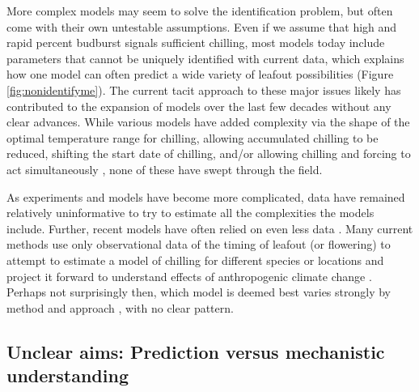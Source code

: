 \documentclass[11pt]{article}
\begin{document}
More complex models may seem to solve the identification problem, but often come with their own untestable assumptions. Even if we assume that high and rapid percent budburst signals sufficient chilling, most models today include parameters that cannot be uniquely identified with current data, which explains how one model can often predict a wide variety of leafout possibilities (Figure \ref{fig:nonidentifyme}). The current tacit approach to these major issues likely has contributed to the expansion of models over the last few decades without any clear advances. While various models have added complexity via the shape of the optimal temperature range for chilling, allowing accumulated chilling to be reduced, shifting the start date of chilling, and/or allowing chilling and forcing to act simultaneously \citep{hanninen1990modelling,Kramer1994,lued2009,pope2014biologically,gusewell2017}, none of these have swept through the field. %

As experiments and models have become more complicated, data have remained relatively uninformative to try to estimate all the complexities the models include. Further, recent models have often relied on even less data \citep{hanninen2019experiments}. Many current methods use only observational data of the timing of leafout (or flowering) to attempt to estimate a model of chilling for different species or locations and project it forward to understand effects of anthropogenic climate change \citep{lued2011,luedeling2012climate,gao2024,fernandez2022unusually}. Perhaps not surprisingly then, which model is deemed best varies strongly by method and approach \citep{Caffarra:2011qf,basler2016evaluating,hufkens2018integrated}, with no clear pattern. 

\subsection*{Unclear aims: Prediction versus mechanistic understanding}
\end{document}
